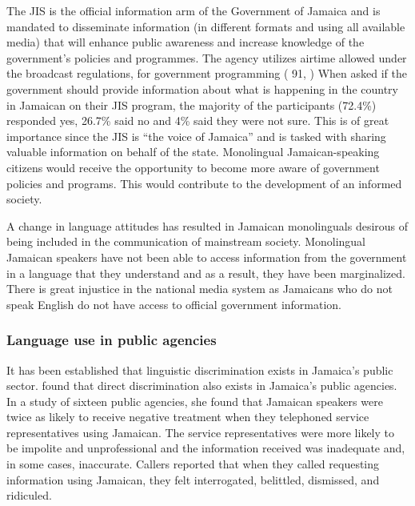 \documentclass[output=paper,colorlinks,citecolor=brown]{langscibook}
\begin{document}
The JIS is the official information arm of the Government of Jamaica and is mandated to disseminate information (in different formats and using all available media) that will enhance public awareness and increase knowledge of the government’s policies and programmes. The agency utilizes airtime allowed under the broadcast regulations, for government programming (\citeauthor{GovernmentJamaicaCommunicationPolicy2015} 91, \citeyear{GovernmentJamaicaCommunicationPolicy2015})
When asked if the government should provide information about what is happening in the country in Jamaican on their JIS program, the majority of the participants (72.4\%) responded yes, 26.7\% said no and 4\% said they were not sure. This is of great importance since the JIS is “the voice of Jamaica” and is tasked with sharing valuable information on behalf of the state. Monolingual Jamaican-speaking citizens would receive the opportunity to become more aware of government policies and programs. This would contribute to the development of an informed society. 

A change in language attitudes has resulted in Jamaican monolinguals desirous of being included in the communication of mainstream society. Monolingual Jamaican speakers have not been able to access information from the government in a language that they understand and as a result, they have been marginalized. There is great injustice in the national media system as Jamaicans who do not speak English do not have access to official government information. 

\subsubsection{Language use in public agencies}

It has been established that linguistic discrimination exists in Jamaica's public sector. \citet{Walters2015} found that direct discrimination also exists in Jamaica's public agencies. In a study of sixteen public agencies, she found that Jamaican speakers were twice as likely to receive negative treatment when they telephoned service representatives using Jamaican. The service representatives were more likely to be impolite and unprofessional and the information received was inadequate and, in some cases, inaccurate. Callers reported that when they called requesting information using Jamaican, they felt interrogated, belittled, dismissed, and ridiculed.
\end{document}
